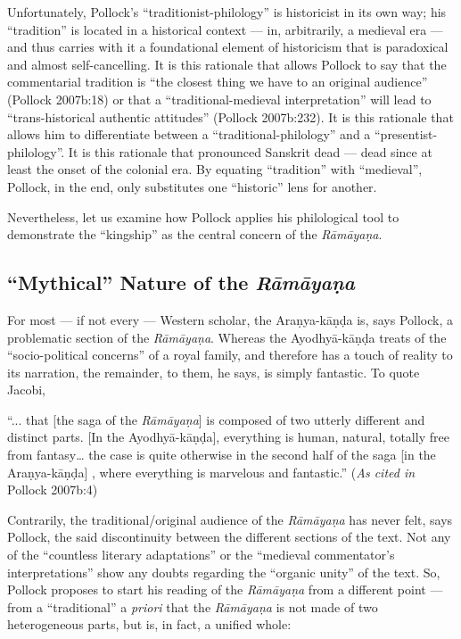 Unfortunately, Pollock’s “traditionist-philology” is historicist in its own way; his “tradition” is located in a historical context --- in, arbitrarily, a medieval era --- and thus carries with it a foundational element of historicism that is paradoxical and almost self-cancelling. It is this rationale that allows Pollock to say that the commentarial tradition is “the closest thing we have to an original audience” (Pollock 2007b:18) or that a “traditional-medieval interpretation” will lead to “trans-historical authentic attitudes” (Pollock 2007b:232). It is this rationale that allows him to differentiate between a “traditional-philology” and a “presentist-philology”. It is this rationale that pronounced Sanskrit dead --- dead since at least the onset of the colonial era. By equating “tradition” with “medieval”, Pollock, in the end, only substitutes one “historic” lens for another. 

Nevertheless, let us examine how Pollock applies his philological tool to demonstrate the “kingship” as the central concern of the {\sl Rāmāyaṇa}. 

\subsection[“Mythical” Nature of the {\sl Rāmāyaṇa}]{“Mythical” Nature of the {\sl\bfseries Rāmāyaṇa}}\label{sec2.2}

For most --- if not every --- Western scholar, the Araṇya-kāṇḍa is, says Pollock, a problematic section of the {\sl Rāmāyaṇa}. Whereas the Ayodhyā-kāṇḍa treats of the “socio-political concerns” of a royal family, and therefore has a touch of reality to its narration, the remainder, to them, he says, is simply fantastic. To quote Jacobi,

\begin{myquote}
“... that [the saga of the {\sl Rāmāyaṇa}] is composed of two utterly different and distinct parts. [In the Ayodhyā-kāṇḍa], everything is human, natural, totally free from fantasy… the case is quite otherwise in the second half of the saga [in the Araṇya-kāṇḍa] , where everything is marvelous and fantastic.” 	
\hfill ({\sl As cited in} Pollock 2007b:4)
\end{myquote}

Contrarily, the traditional/original audience of the {\sl Rāmāyaṇa} has never felt, says Pollock, the said discontinuity between the different sections of the text. Not any of the “countless literary adaptations” or the “medieval commentator’s interpretations” show any doubts regarding the “organic unity” of the text. So, Pollock proposes to start his reading of the {\sl Rāmāyaṇa} from a different point --- from a “traditional” a {\sl priori} that the {\sl Rāmāyaṇa} is not made of two heterogeneous parts, but is, in fact, a unified whole:

